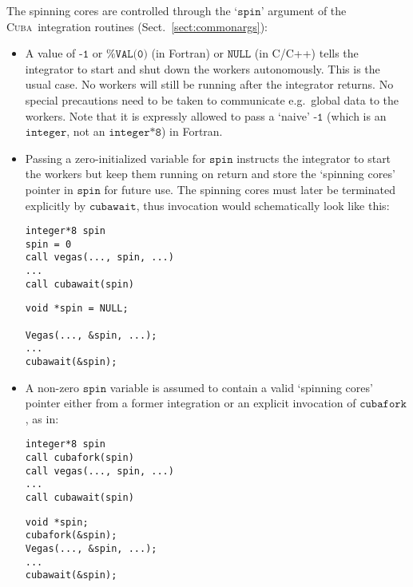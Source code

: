 \documentclass[12pt]{article}
\newcommand\cuba{\textsc{Cuba}}
\newcommand\eg{e.g.\ }
\newcommand\Code[1]{\ensuremath{\texttt{#1}}}
\begin{document}
The spinning cores are controlled through the `\Code{spin}' argument of 
the \cuba\ integration routines (Sect.~\ref{sect:commonargs}):
\begin{itemize}
\item A value of \Code{-1} or \Code{\%VAL(0)} (in Fortran) or 
\Code{NULL} (in C/C++) tells the integrator to start and shut down the 
workers autonomously.  This is the usual case.  No workers will still be 
running after the integrator returns.  No special precautions need to be 
taken to communicate \eg global data to the workers.  Note that it is 
expressly allowed to pass a `naive' \Code{-1} (which is an 
\Code{integer}, not an \Code{integer*8}) in Fortran.

\item Passing a zero-initialized variable for \Code{spin} instructs the 
integrator to start the workers but keep them running on return and 
store the `spinning cores' pointer in \Code{spin} for future use.  The 
spinning cores must later be terminated explicitly by \Code{cubawait}, 
thus invocation would schematically look like this:

\hfill\begin{minipage}{.4\hsize}
\begin{verbatim}
integer*8 spin
spin = 0
call vegas(..., spin, ...)
...
call cubawait(spin)
\end{verbatim}
\end{minipage}\hfill\begin{minipage}{.4\hsize}
\begin{verbatim}
void *spin = NULL;

Vegas(..., &spin, ...);
...
cubawait(&spin);
\end{verbatim}
\end{minipage}\hfill

\item A non-zero \Code{spin} variable is assumed to contain a valid 
`spinning cores' pointer either from a former integration or an explicit 
invocation of \Code{cubafork}, as in:

\hfill\begin{minipage}{.4\hsize}
\begin{verbatim}
integer*8 spin
call cubafork(spin)
call vegas(..., spin, ...)
...
call cubawait(spin)
\end{verbatim}
\end{minipage}\hfill\begin{minipage}{.4\hsize}
\begin{verbatim}
void *spin;
cubafork(&spin);
Vegas(..., &spin, ...);
...
cubawait(&spin);
\end{verbatim}
\end{minipage}\hfill
\end{itemize}
\end{document}
